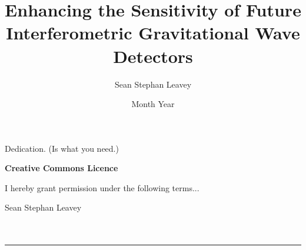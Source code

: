 \documentclass[twoside,nogutter]{glasgowthesis}
\begin{document}

\title{Enhancing the Sensitivity of Future Interferometric Gravitational Wave Detectors}
\author{Sean Stephan Leavey}
\date{Month Year}

\maketitle

\cleardoublepage



\newpage


\cleardoublepage
\vspace*{1.75in}
\begin{flushright} Dedication. (Is what you need.)\end{flushright}



\newpage

\vspace*{1.75in}
\begin{center} {\bf Creative Commons Licence}\end{center}
\noindent I hereby grant permission under the following terms...

\begin{description}
\item Sean Stephan Leavey\ \\ \ \\ \ \\
\hrule
\end{description}
\newpage


 

\newpage


\renewcommand{\contentsname}{Table of contents}
\tableofcontents

\listoftables
{}
\end{document}
